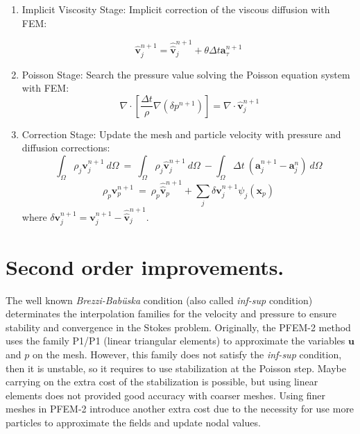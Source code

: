\documentclass[a4paper,conference]{IEEEtran}
\begin{document}
\begin{enumerate}
  \item Implicit Viscosity Stage: Implicit correction of the viscous diffusion with FEM:
  
 \begin{equation}\label{Step4a}
\displaystyle \widehat{\mathbf{v}}^{n+1}_{j}=\widehat{\widehat{\mathbf{v}}}^{n+1}_{j} + \theta \Delta t \mathbf{a}^{n+1}_{\tau}
\end{equation}

 \item Poisson Stage: Search the pressure value solving the Poisson equation system with FEM: 
 \begin{equation}\label{Step5a}
  \ \nabla \cdot [\frac{\Delta t}{\rho}\nabla(\delta p^{n+1})] = \nabla \cdot \widehat{\mathbf{v}}_j^{n+1}
 \end{equation}

 \item Correction Stage: Update the mesh and particle velocity with pressure and diffusion corrections:
 \begin{equation}\label{Step6a}
  \int_{\Omega} \rho_j \mathbf{v}_j^{n+1}\ d\Omega \ = \ \int_{\Omega} \rho_j  \widehat{\mathbf{v}}_j^{n+1}\ d\Omega\ - \int_{\Omega} \Delta t \ (\mathbf{a}_j^{n+1} - \mathbf{a}_j^{n})\ d\Omega 
 \end{equation}
  \begin{equation}\label{Step6b}
  \rho_p \mathbf{v}_p^{n+1}\  = \ \rho_p \widehat{\widehat{\mathbf{v}}}_p^{n+1} + \sum_{j} \delta \mathbf{v}_j^{n+1} \psi_j(\mathbf{x}_{p})
  \end{equation}
  where $\delta \mathbf{v}_j^{n+1} = \mathbf{v}_j^{n+1}-\widehat{\widehat{\mathbf{v}}}_j^{n+1}$.

\end{enumerate}

\section{Second order improvements.}


The well known \textit{Brezzi-Babüska} condition (also called \textit{inf-sup} condition) determinates the interpolation families for the velocity and pressure to ensure stability and convergence in the Stokes problem. Originally, the PFEM-2 method uses the family P1/P1 (linear triangular elements) to approximate the variables $\mathbf{u}$ and $p$ on the mesh\cite{Idelsohn12b}. %
However, this family does not satisfy the \textit{inf-sup} condition, then it is unstable, so it requires to use stabilization at the Poisson step. Maybe carrying on the extra cost of the stabilization is possible, but using linear elements does not provided good accuracy with coarser meshes. Using finer meshes in PFEM-2 introduce another extra cost due to the necessity for use more particles to approximate the fields and update nodal values. 
\end{document}
